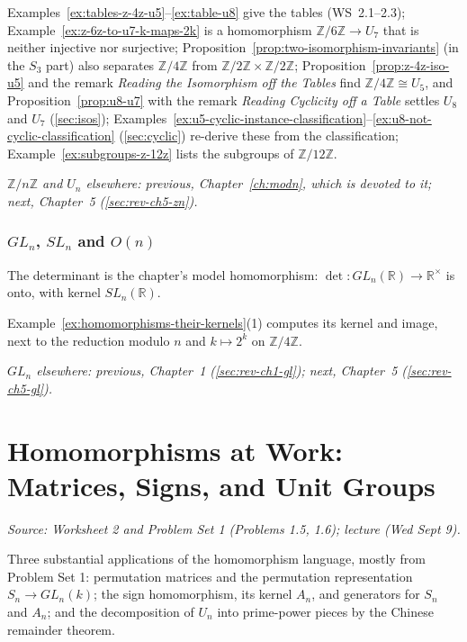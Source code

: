 \documentclass[11pt]{report}
\begin{document}
Examples~\ref{ex:tables-z-4z-u5}--\ref{ex:table-u8} give the tables (WS~2.1--2.3); Example~\ref{ex:z-6z-to-u7-k-maps-2k} is a homomorphism $\mathbb{Z}/6\mathbb{Z} \to U_7$ that is neither injective nor surjective; Proposition~\ref{prop:two-isomorphism-invariants} (in the $S_3$ part) also separates $\mathbb{Z}/4\mathbb{Z}$ from $\mathbb{Z}/2\mathbb{Z} \times \mathbb{Z}/2\mathbb{Z}$; Proposition~\ref{prop:z-4z-iso-u5} and the remark \emph{Reading the Isomorphism off the Tables} find $\mathbb{Z}/4\mathbb{Z} \cong U_5$, and Proposition~\ref{prop:u8-u7} with the remark \emph{Reading Cyclicity off a Table} settles $U_8$ and $U_7$ (\ref{sec:isos}); Examples~\ref{ex:u5-cyclic-instance-classification}--\ref{ex:u8-not-cyclic-classification} (\ref{sec:cyclic}) re-derive these from the classification; Example~\ref{ex:subgroups-z-12z} lists the subgroups of $\mathbb{Z}/12\mathbb{Z}$.

\textit{$\mathbb{Z}/n\mathbb{Z}$ and $U_n$ elsewhere: previous, Chapter~\ref{ch:modn}, which is devoted to it; next, Chapter~5 (\ref{sec:rev-ch5-zn}).}

\subsection{\texorpdfstring{$GL_n$, $SL_n$ and $O(n)$}{GLₙ, SLₙ and O(n)}}\label{sec:rev-ch4-gl}

The determinant is the chapter's model homomorphism: $\det: GL_n(\mathbb{R}) \to \mathbb{R}^\times$ is onto, with kernel $SL_n(\mathbb{R})$.

Example~\ref{ex:homomorphisms-their-kernels}(1) computes its kernel and image, next to the reduction modulo $n$ and $k \mapsto 2^k$ on $\mathbb{Z}/4\mathbb{Z}$.

\textit{$GL_n$ elsewhere: previous, Chapter~1 (\ref{sec:rev-ch1-gl}); next, Chapter~5 (\ref{sec:rev-ch5-gl}).}

\chapter{Homomorphisms at Work: Matrices, Signs, and Unit Groups}\label{ch:hom-work}

\textit{Source: Worksheet 2 and Problem Set 1 (Problems 1.5, 1.6); lecture (Wed Sept 9).}

Three substantial applications of the homomorphism language, mostly from Problem Set 1: permutation matrices and the permutation representation $S_n \to GL_n(k)$; the sign homomorphism, its kernel $A_n$, and generators for $S_n$ and $A_n$; and the decomposition of $U_n$ into prime-power pieces by the Chinese remainder theorem.
\end{document}
